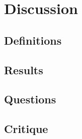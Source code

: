 \documentclass{article} %
\newcounter{source}
\begin{document}

\section {Discussion}








\subsection{Definitions}






\subsection{Results}






\subsection{Questions}







\subsection{Critique}
\end{document}
